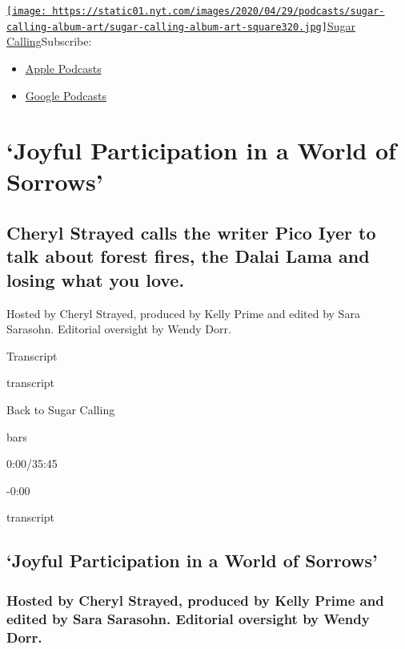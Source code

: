 \href{https://www.nytimes.com/column/sugar-calling}{\texttt{[image: https://static01.nyt.com/images/2020/04/29/podcasts/sugar-calling-album-art/sugar-calling-album-art-square320.jpg]}Sugar
Calling}Subscribe:

\begin{itemize}
\tightlist
\item
  \href{https://itunes.apple.com/us/podcast/id1505881384}{Apple
  Podcasts}
\item
  \href{https://podcasts.google.com/?feed=aHR0cHM6Ly9yc3MuYXJ0MTkuY29tL3N1Z2FyLWNhbGxpbmc\&ved=0CAUQrrcFahcKEwjA8Kyn09voAhUAAAAAHQAAAAAQBQ}{Google
  Podcasts}
\end{itemize}

\hypertarget{joyful-participation-in-a-world-of-sorrows-1}{%
\section{`Joyful Participation in a World of
Sorrows'}\label{joyful-participation-in-a-world-of-sorrows-1}}

\hypertarget{cheryl-strayed-calls-the-writer-pico-iyer-to-talk-about-forest-fires-the-dalai-lama-and-losing-what-you-love-1}{%
\subsection{Cheryl Strayed calls the writer Pico Iyer to talk about
forest fires, the Dalai Lama and losing what you
love.}\label{cheryl-strayed-calls-the-writer-pico-iyer-to-talk-about-forest-fires-the-dalai-lama-and-losing-what-you-love-1}}

Hosted by Cheryl Strayed, produced by Kelly Prime and edited by Sara
Sarasohn. Editorial oversight by Wendy Dorr.

Transcript

transcript

Back to Sugar Calling

bars

0:00/35:45

-0:00

transcript

\hypertarget{joyful-participation-in-a-world-of-sorrows-2}{%
\subsection{`Joyful Participation in a World of
Sorrows'}\label{joyful-participation-in-a-world-of-sorrows-2}}

\hypertarget{hosted-by-cheryl-strayed-produced-by-kelly-prime-and-edited-by-sara-sarasohn-editorial-oversight-by-wendy-dorr-1}{%
\subsubsection{Hosted by Cheryl Strayed, produced by Kelly Prime and
edited by Sara Sarasohn. Editorial oversight by Wendy
Dorr.}\label{hosted-by-cheryl-strayed-produced-by-kelly-prime-and-edited-by-sara-sarasohn-editorial-oversight-by-wendy-dorr-1}}

